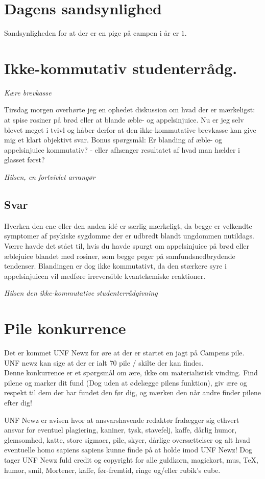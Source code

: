 \begin{minipage}[b]{0.95\linewidth}
\begin{minipage}[t]{0.47\textwidth}
\section*{Dagens sandsynlighed}
Sandsynligheden for at der er en pige på campen i år er $1$.

\section*{Ikke-kommutativ studenterrådg.}
\emph{Kære brevkasse}

Tirsdag morgen overhørte jeg en ophedet diskussion om hvad der er mærkeligst: at spise rosiner på brød eller at blande æble- og appelsinjuice. Nu er jeg selv blevet meget i tvivl og håber derfor at den ikke-kommutative brevkasse kan give mig et klart objektivt svar. Bonus spørgsmål: Er blanding af æble- og appelsinjuice kommutativ? - eller afhænger resultatet af hvad man hælder i glasset først?
 
\emph{Hilsen, en fortvivlet arrangør}

\subsection*{Svar}
Hverken den ene eller den anden idé er særlig mærkeligt, da begge er velkendte symptomer af psykiske sygdomme der er udbredt blandt ungdommen nutildags. Værre havde det stået til, hvis du havde spurgt om appelsinjuice på brød eller æblejuice blandet med rosiner, som begge peger på samfundsnedbrydende tendenser. Blandingen er dog ikke kommutativt, da den stærkere syre i appelsinjuicen vil medføre irreversible kvantekemiske reaktioner.

{\flushright\emph{Hilsen den ikke-kommutative studenterrådgivning}}


\vspace{-2mm}
\section*{Pile konkurrence}
Det er kommet UNF Newz for øre at der er startet en jagt på Campens pile. UNF newz kan sige at der er ialt 70 pile / skilte der kan findes. \\
Denne konkurrence er et spørgsmål om ære, ikke om materialistisk vinding. Find pilene og marker dit fund (Dog uden at ødelægge pilens funktion), giv ære og respekt til dem der har fundet den før dig, og mærken den når andre finder pilene efter dig!

\end{minipage}

\begin{center}
\tiny UNF Newz er avisen hvor at ansvarshavende redaktør fralægger sig ethvert ansvar for eventuel plagiering, kaniner, tysk, stavefelj, kaffe, dårlig humor, glemsomhed, katte, store sigmaer, pile, skyer, dårlige oversættelser og alt hvad eventuelle homo sapiens sapiens kunne finde på at holde imod UNF Newz! Dog tager UNF Newz fuld credit og copyright for alle guldkorn, magickort, mus, \TeX, humor, smil, Mortener, kaffe, før-fremtid, ringe og/eller rubik's cube.
\end{center}
\end{minipage}

